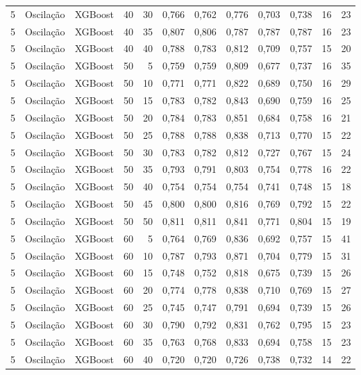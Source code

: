 \begin{longtable}{@{}rllrrrrrrrrr@{}}
5 & Oscilação & XGBoost & 40 & 30 & 0,766 & 0,762 & 0,776 & 0,703 & 0,738 & 16 & 23 \\
5 & Oscilação & XGBoost & 40 & 35 & 0,807 & 0,806 & 0,787 & 0,787 & 0,787 & 16 & 23 \\
5 & Oscilação & XGBoost & 40 & 40 & 0,788 & 0,783 & 0,812 & 0,709 & 0,757 & 15 & 20 \\
5 & Oscilação & XGBoost & 50 & 5 & 0,759 & 0,759 & 0,809 & 0,677 & 0,737 & 16 & 35 \\
5 & Oscilação & XGBoost & 50 & 10 & 0,771 & 0,771 & 0,822 & 0,689 & 0,750 & 16 & 29 \\
5 & Oscilação & XGBoost & 50 & 15 & 0,783 & 0,782 & 0,843 & 0,690 & 0,759 & 16 & 25 \\
5 & Oscilação & XGBoost & 50 & 20 & 0,784 & 0,783 & 0,851 & 0,684 & 0,758 & 16 & 21 \\
5 & Oscilação & XGBoost & 50 & 25 & 0,788 & 0,788 & 0,838 & 0,713 & 0,770 & 15 & 22 \\
5 & Oscilação & XGBoost & 50 & 30 & 0,783 & 0,782 & 0,812 & 0,727 & 0,767 & 15 & 24 \\
5 & Oscilação & XGBoost & 50 & 35 & 0,793 & 0,791 & 0,803 & 0,754 & 0,778 & 16 & 22 \\
5 & Oscilação & XGBoost & 50 & 40 & 0,754 & 0,754 & 0,754 & 0,741 & 0,748 & 15 & 18 \\
5 & Oscilação & XGBoost & 50 & 45 & 0,800 & 0,800 & 0,816 & 0,769 & 0,792 & 15 & 22 \\
5 & Oscilação & XGBoost & 50 & 50 & 0,811 & 0,811 & 0,841 & 0,771 & 0,804 & 15 & 19 \\
5 & Oscilação & XGBoost & 60 & 5 & 0,764 & 0,769 & 0,836 & 0,692 & 0,757 & 15 & 41 \\
5 & Oscilação & XGBoost & 60 & 10 & 0,787 & 0,793 & 0,871 & 0,704 & 0,779 & 15 & 31 \\
5 & Oscilação & XGBoost & 60 & 15 & 0,748 & 0,752 & 0,818 & 0,675 & 0,739 & 15 & 26 \\
5 & Oscilação & XGBoost & 60 & 20 & 0,774 & 0,778 & 0,838 & 0,710 & 0,769 & 15 & 27 \\
5 & Oscilação & XGBoost & 60 & 25 & 0,745 & 0,747 & 0,791 & 0,694 & 0,739 & 15 & 26 \\
5 & Oscilação & XGBoost & 60 & 30 & 0,790 & 0,792 & 0,831 & 0,762 & 0,795 & 15 & 23 \\
5 & Oscilação & XGBoost & 60 & 35 & 0,763 & 0,768 & 0,833 & 0,694 & 0,758 & 15 & 23 \\
5 & Oscilação & XGBoost & 60 & 40 & 0,720 & 0,720 & 0,726 & 0,738 & 0,732 & 14 & 22 \\

\end{longtable}
